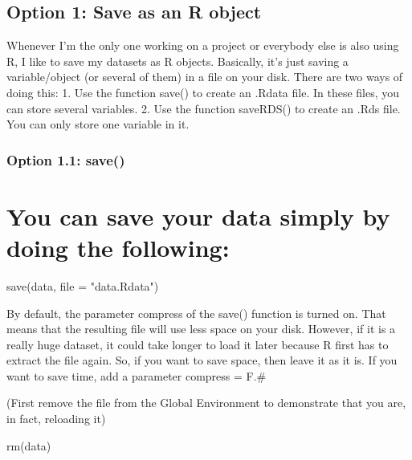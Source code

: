 \documentclass[
]{article}
\newenvironment{Shaded}{\begin{snugshade}}{\end{snugshade}}
\newcommand{\AttributeTok}[1]{\textcolor[rgb]{0.77,0.63,0.00}{#1}}
\newcommand{\FunctionTok}[1]{\textcolor[rgb]{0.00,0.00,0.00}{#1}}
\newcommand{\NormalTok}[1]{#1}
\newcommand{\StringTok}[1]{\textcolor[rgb]{0.31,0.60,0.02}{#1}}
\begin{document}
\hypertarget{option-1-save-as-an-r-object}{%
\subsection{Option 1: Save as an R
object}\label{option-1-save-as-an-r-object}}

Whenever I'm the only one working on a project or everybody else is also
using R, I like to save my datasets as R objects. Basically, it's just
saving a variable/object (or several of them) in a file on your disk.
There are two ways of doing this: 1. Use the function save() to create
an .Rdata file. In these files, you can store several variables. 2. Use
the function saveRDS() to create an .Rds file. You can only store one
variable in it.

\hypertarget{option-1.1-save}{%
\subsubsection{Option 1.1: save()}\label{option-1.1-save}}

\hypertarget{you-can-save-your-data-simply-by-doing-the-following}{%
\section{You can save your data simply by doing the
following:}\label{you-can-save-your-data-simply-by-doing-the-following}}

\begin{Shaded}
\begin{Highlighting}[]
\FunctionTok{save}\NormalTok{(data, }\AttributeTok{file =} \StringTok{"data.Rdata"}\NormalTok{)}
\end{Highlighting}
\end{Shaded}

By default, the parameter compress of the save() function is turned on.
That means that the resulting file will use less space on your disk.
However, if it is a really huge dataset, it could take longer to load it
later because R first has to extract the file again. So, if you want to
save space, then leave it as it is. If you want to save time, add a
parameter compress = F.\#

(First remove the file from the Global Environment to demonstrate that
you are, in fact, reloading it)

\begin{Shaded}
\begin{Highlighting}[]
\FunctionTok{rm}\NormalTok{(data)}
\end{Highlighting}
\end{Shaded}
\end{document}
